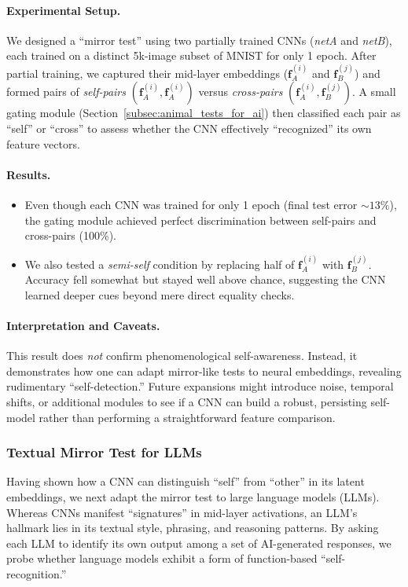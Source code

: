 \documentclass[12pt]{article}
\begin{document}
\paragraph{Experimental Setup.}
We designed a “mirror test” using two partially trained CNNs (\textit{netA} and \textit{netB}), each 
trained on a distinct 5k-image subset of MNIST for only 1 epoch. After partial training, we captured 
their mid-layer embeddings (\(\mathbf{f}_A^{(i)}\) and \(\mathbf{f}_B^{(j)}\)) and formed pairs of 
\emph{self-pairs} \((\mathbf{f}_A^{(i)},\mathbf{f}_A^{(i)})\) versus \emph{cross-pairs} 
\((\mathbf{f}_A^{(i)},\mathbf{f}_B^{(j)})\). A small gating module 
(Section~\ref{subsec:animal_tests_for_ai}) then classified each pair as “self” or “cross” 
to assess whether the CNN effectively “recognized” its own feature vectors.  

\paragraph{Results.}
\begin{itemize}
  \item Even though each CNN was trained for only 1 epoch (final test error $\sim13\%$), 
        the gating module achieved perfect discrimination between self-pairs and cross-pairs (100\%).
  \item We also tested a \emph{semi-self} condition by replacing half of \(\mathbf{f}_A^{(i)}\) 
        with \(\mathbf{f}_B^{(j)}\). Accuracy fell somewhat but stayed well above chance, 
        suggesting the CNN learned deeper cues beyond mere direct equality checks.
\end{itemize}

\paragraph{Interpretation and Caveats.}
This result does \emph{not} confirm phenomenological self-awareness. Instead, it 
demonstrates how one can adapt mirror-like tests to neural embeddings, revealing 
rudimentary “self-detection.” Future expansions might introduce noise, temporal shifts, 
or additional modules to see if a CNN can build a robust, persisting self-model 
rather than performing a straightforward feature comparison.

\subsubsection{Textual Mirror Test for LLMs}
Having shown how a CNN can distinguish “self” from “other” in its latent embeddings, 
we next adapt the mirror test to large language models (LLMs). Whereas CNNs manifest 
“signatures” in mid-layer activations, an LLM’s hallmark lies in its textual style, 
phrasing, and reasoning patterns. By asking each LLM to identify its own output among 
a set of AI-generated responses, we probe whether language models exhibit a form of 
function-based “self-recognition.”
\end{document}

